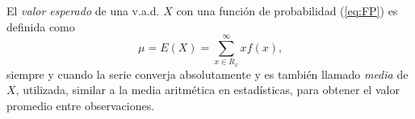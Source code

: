 El \emph{valor esperado} de una v.a.d. $X$ con una función de probabilidad (\ref{eq:FP}) es definida como
\begin{equation}
\mu=E(X)=\sum_{x\in R_x}^{\infty}xf(x)\text{,}
\end{equation}
siempre y cuando la serie converja absolutamente y es también llamado \emph{media} de $X$, utilizada, similar a la media aritmética en estadísticas, para obtener el valor promedio entre observaciones.

